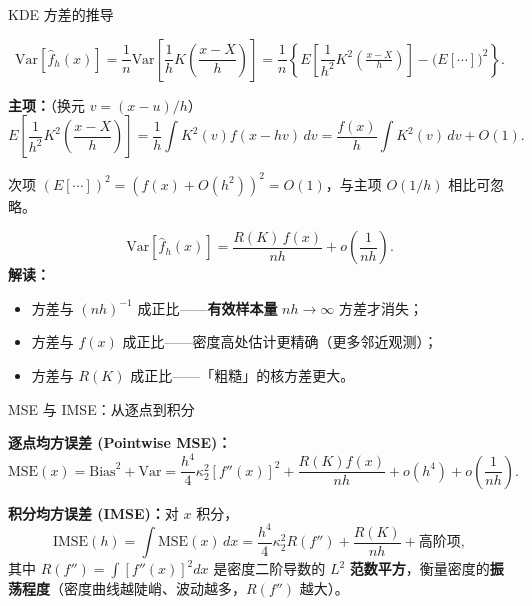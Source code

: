 \documentclass[aspectratio=169, 10pt]{beamer}
\begin{document}
\begin{frame}{KDE 方差的推导}

  \[
    \text{Var}[\hat f_h(x)] = \frac{1}{n}\text{Var}\!\left[\frac{1}{h}K\!\left(\frac{x-X}{h}\right)\right]
    = \frac{1}{n}\left\{E\!\left[\frac{1}{h^2}K^2\!\left(\tfrac{x-X}{h}\right)\right] - \bigl(E[\cdots]\bigr)^2\right\}.
  \]

  \textbf{主项：}（换元 $v = (x-u)/h$）
  \[
    E\!\left[\frac{1}{h^2}K^2\!\left(\frac{x-X}{h}\right)\right]
    = \frac{1}{h}\int K^2(v) f(x-hv)\, dv
    = \frac{f(x)}{h}\int K^2(v)\, dv + O(1).
  \]

  次项 $(E[\cdots])^2 = (f(x)+O(h^2))^2 = O(1)$，与主项 $O(1/h)$ 相比可忽略。

  \begin{highlightbox}
    \[
      \boxed{\;\text{Var}[\hat f_h(x)] = \frac{R(K)\, f(x)}{nh} + o\!\left(\frac{1}{nh}\right).\;}
    \]
    \textbf{解读：}
    \begin{itemize}
      \item 方差与 $(nh)^{-1}$ 成正比——\textbf{有效样本量} $nh\to\infty$ 方差才消失；
      \item 方差与 $f(x)$ 成正比——密度高处估计更精确（更多邻近观测）；
      \item 方差与 $R(K)$ 成正比——「粗糙」的核方差更大。
    \end{itemize}
  \end{highlightbox}

\end{frame}


\begin{frame}{MSE 与 IMSE：从逐点到积分}

  \textbf{逐点均方误差 (Pointwise MSE)：}
  \[
    \text{MSE}(x) = \text{Bias}^2 + \text{Var}
    = \frac{h^4}{4}\kappa_2^2 [f''(x)]^2 + \frac{R(K)f(x)}{nh} + o(h^4) + o\!\left(\frac{1}{nh}\right).
  \]

  \textbf{积分均方误差 (IMSE)：}对 $x$ 积分，
  \[
    \text{IMSE}(h) = \int \text{MSE}(x)\, dx
    = \frac{h^4}{4}\kappa_2^2 R(f'') + \frac{R(K)}{nh} + \text{高阶项},
  \]
  其中 $R(f'') = \int [f''(x)]^2 dx$ 是密度二阶导数的 $L^2$ \textbf{范数平方}，衡量密度的\textbf{振荡程度}（密度曲线越陡峭、波动越多，$R(f'')$ 越大）。

\end{frame}
\end{document}
